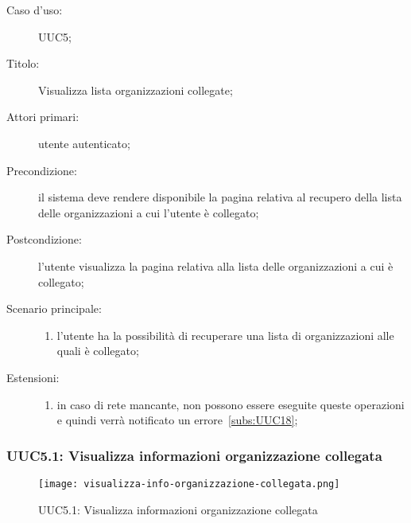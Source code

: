 \documentclass[../../../analisi-dei-requisiti.tex]{subfiles}
\begin{document}
\begin{description}
  \item[Caso d'uso:] UUC5;
  \item[Titolo:] Visualizza lista organizzazioni collegate;
  \item[Attori primari:] utente autenticato;
  \item[Precondizione:] il sistema deve rendere disponibile la pagina relativa al recupero della lista delle organizzazioni a cui l'utente è collegato;
  \item[Postcondizione:] l'utente visualizza la pagina relativa alla lista delle organizzazioni a cui è collegato;
  \item[Scenario principale:]
        \begin{enumerate}
          \item l'utente ha la possibilità di recuperare una lista di organizzazioni alle quali è collegato;
        \end{enumerate}
  \item[Estensioni:]
        \begin{enumerate}
          \item in caso di rete mancante, non possono essere eseguite queste operazioni e quindi verrà notificato un errore~\ref{subs:UUC18};
        \end{enumerate}
\end{description}

\subsubsection{UUC5.1: Visualizza informazioni organizzazione collegata}%
\label{subs:UUC5.1}

\begin{figure}[H]
  \centering
  \texttt{[image: visualizza-info-organizzazione-collegata.png]}
  \caption{UUC5.1: Visualizza informazioni organizzazione collegata}%
  \label{fig:UUC5.1}
\end{figure}
\end{document}
